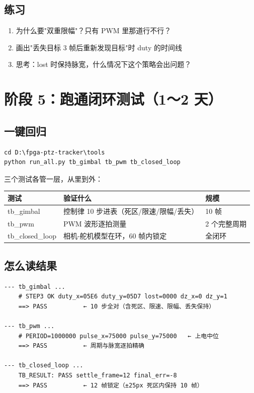 \documentclass[11pt]{ctexart}
\begin{document}
\subsection{练习}

\begin{enumerate}
  \item 为什么要"双重限幅"？只有 PWM 里那道行不行？
  \item 画出"丢失目标 3 帧后重新发现目标"时 duty 的时间线
  \item 思考：lost 时保持脉宽，什么情况下这个策略会出问题？
\end{enumerate}

\section{阶段 5：跑通闭环测试（1～2 天）}

\subsection{一键回归}

\begin{Verbatim}
cd D:\fpga-ptz-tracker\tools
python run_all.py tb_gimbal tb_pwm tb_closed_loop
\end{Verbatim}

三个测试各管一层，从里到外：

\begin{center}
\begin{tabular}{lll}
\toprule
\rowcolor{rowtint}\textbf{测试} & \textbf{验证什么} & \textbf{规模} \\
\midrule
tb\_gimbal     & 控制律 10 步进表（死区/限速/限幅/丢失） & 10 帧 \\
tb\_pwm        & PWM 波形逐拍测量 & 2 个完整周期 \\
tb\_closed\_loop & 相机-舵机模型在环，60 帧内锁定 & 全闭环 \\
\bottomrule
\end{tabular}
\end{center}

\subsection{怎么读结果}

\begin{Verbatim}
--- tb_gimbal ...
    # STEP3 OK duty_x=05E6 duty_y=05D7 lost=0000 dz_x=0 dz_y=1
    ==> PASS          ← 10 步全对（含死区、限速、限幅、丢失保持）

--- tb_pwm ...
    # PERIOD=1000000 pulse_x=75000 pulse_y=75000   ← 上电中位
    ==> PASS          ← 周期与脉宽逐拍精确

--- tb_closed_loop ...
    TB_RESULT: PASS settle_frame=12 final_err=-8
    ==> PASS          ← 12 帧锁定（±25px 死区内保持 10 帧）
\end{Verbatim}
\end{document}
